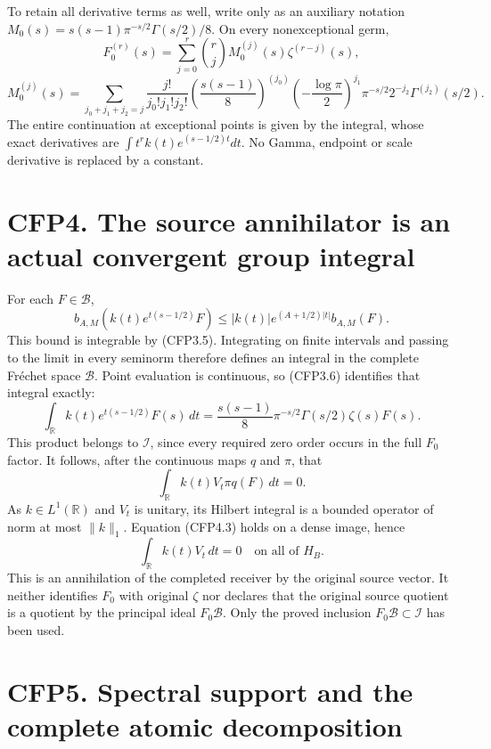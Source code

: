 To retain all derivative terms as well, write only as an auxiliary
notation \(M_0(s)=s(s-1)\pi^{-s/2}\Gamma(s/2)/8\). On every
nonexceptional germ, \[
F_0^{(r)}(s)=\sum_{j=0}^r\binom rj M_0^{(j)}(s)\zeta^{(r-j)}(s),
\] \[
M_0^{(j)}(s)=\sum_{j_0+j_1+j_2=j}
\frac{j!}{j_0!j_1!j_2!}
\left(\frac{s(s-1)}8\right)^{(j_0)}
\left(-\frac{\log\pi}2\right)^{j_1}\pi^{-s/2}
2^{-j_2}\Gamma^{(j_2)}(s/2).
\tag{CFP3.10}
\] The entire continuation at exceptional points is given by the
integral, whose exact derivatives are \(\int t^rk(t)e^{(s-1/2)t}dt\). No
Gamma, endpoint or scale derivative is replaced by a constant.

\section{CFP4. The source annihilator is an actual convergent group
integral}\label{cfp4.-the-source-annihilator-is-an-actual-convergent-group-integral}

For each \(F\in\mathcal B\), \[
b_{A,M}(k(t)e^{t(s-1/2)}F)
\le |k(t)|e^{(A+1/2)|t|}b_{A,M}(F).
\tag{CFP4.1}
\] This bound is integrable by (CFP3.5). Integrating on finite intervals
and passing to the limit in every seminorm therefore defines an integral
in the complete Fréchet space \(\mathcal B\). Point evaluation is
continuous, so (CFP3.6) identifies that integral exactly: \[
\int_{\mathbb R} k(t)e^{t(s-1/2)}F(s)\,dt
=\frac{s(s-1)}8\pi^{-s/2}\Gamma(s/2)\zeta(s)F(s).
\tag{CFP4.2}
\] This product belongs to \(\mathcal I\), since every required zero
order occurs in the full \(F_0\) factor. It follows, after the
continuous maps \(q\) and \(\pi\), that \[
\int_{\mathbb R}k(t)V_t\pi q(F)\,dt=0.
\tag{CFP4.3}
\] As \(k\in L^1(\mathbb R)\) and \(V_t\) is unitary, its Hilbert
integral is a bounded operator of norm at most \(\|k\|_1\). Equation
(CFP4.3) holds on a dense image, hence \[
\boxed{\int_{\mathbb R}k(t)V_t\,dt=0\quad\text{on all of }H_B.}
\tag{CFP4.4}
\] This is an annihilation of the completed receiver by the original
source vector. It neither identifies \(F_0\) with original \(\zeta\) nor
declares that the original source quotient is a quotient by the
principal ideal \(F_0\mathcal B\). Only the proved inclusion
\(F_0\mathcal B\subset\mathcal I\) has been used.

\section{CFP5. Spectral support and the complete atomic
decomposition}\label{cfp5.-spectral-support-and-the-complete-atomic-decomposition}

